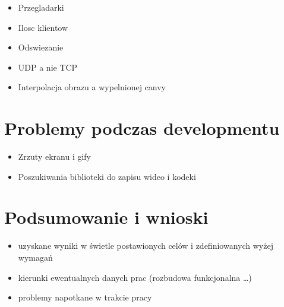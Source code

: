 \documentclass[a4paper,twoside,12pt]{book}
\begin{document}
\begin{itemize}
\item Przegladarki 
\item Ilosc klientow
\item Odswiezanie
\item UDP a nie TCP
\item Interpolacja obrazu a wypelnionej canvy
\end{itemize}


\chapter{Problemy podczas developmentu}
\label{problems}


\begin{itemize}
\item Zrzuty ekranu i gify
\item Poszukiwania biblioteki do zapisu wideo i kodeki

\end{itemize}


\chapter{Podsumowanie i wnioski}
\begin{itemize}
\item uzyskane wyniki w świetle postawionych celów i zdefiniowanych wyżej wymagań
\item kierunki ewentualnych danych prac (rozbudowa funkcjonalna …)
\item problemy napotkane w trakcie pracy
\end{itemize}



\backmatter
\end{document}

